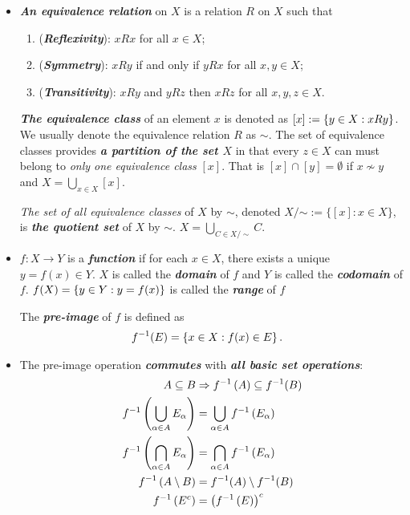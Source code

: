 \documentclass[11pt]{article}
\begin{document}
\begin{itemize}
\item \begin{definition}
\emph{\textbf{An equivalence relation}} on $X$ is a relation $R$ on $X$ such that 
\begin{enumerate}
\item (\emph{\textbf{Reflexivity}}): $xRx$ for all $x \in X$;
\item (\emph{\textbf{Symmetry}}): $xRy$ if and only if $yRx$ for all $x,y \in X$;
\item (\emph{\textbf{Transitivity}}): $xRy$ and $yRz$ then $xRz$ for all $x,y,z \in X$. 
\end{enumerate}
\emph{\textbf{The equivalence class}} of an element $x$ is denoted as $[x] := \left\{y \in X:  xRy\right\}$. We usually denote the equivalence relation $R$ as $\sim$. The set of equivalence classes provides \emph{\textbf{a partition of the set $X$}} in that every $z \in X$ can must belong to \emph{only one equivalence class} $[x]$. That is $[x] \cap [y] = \emptyset$ if $x \not\sim y$ and $X = \bigcup_{x \in X}[x]$.

\emph{The set of all equivalence classes} of $X$ by $\sim$, denoted $X/{\mathord {\sim }}:= \{[x]: x \in X \}$, is \emph{\textbf{the quotient set}} of $X$ by $\sim$.  $X = \bigcup_{C \in X/\sim}C.$
\end{definition}

\item \begin{definition} 
$f: X\rightarrow Y$ is a \emph{\textbf{function}} if for each $x \in X$, there exists a unique $y = f(x) \in Y$. $X$ is called the \emph{\textbf{domain}} of $f$ and $Y$ is called the  \emph{\textbf{codomain}} of $f$. $f(X) = \left\{y \in Y: y = f(x)\right\}$ is called the \emph{\textbf{range}} of $f$

The \emph{\textbf{pre-image}} of $f$ is defined as
\begin{align*}
f^{-1}(E) &= \left\{x \in X: f(x) \in E\right\}.
\end{align*}
\end{definition}


\item \begin{remark}
The pre-image operation \emph{\textbf{commutes}} with \emph{\textbf{all basic set operations}}:
\begin{align*}
A \subseteq B & \Rightarrow f^{-1}\left(A\right) \subseteq f^{-1}(B) \\
f^{-1}\left(\bigcup_{\alpha \in A}E_{\alpha}\right) &= \bigcup_{\alpha \in A}f^{-1}\left(E_{\alpha}\right)\\
f^{-1}\left(\bigcap_{\alpha \in A}E_{\alpha}\right) &= \bigcap_{\alpha \in A}f^{-1}\left(E_{\alpha}\right)\\
f^{-1}\left(A \setminus B\right) &= f^{-1}(A) \setminus f^{-1}(B) \\
f^{-1}\left(E^c\right) &= \left(f^{-1}\left(E\right)\right)^c 
\end{align*}
\end{remark}



\end{itemize}
\end{document}
